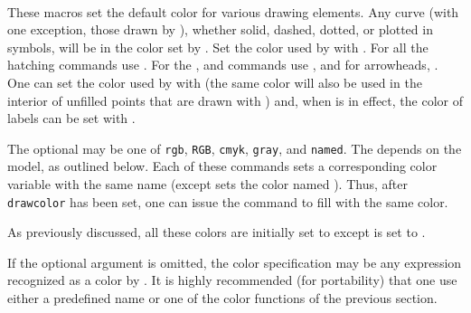 \documentclass[letterpaper]{article}
\begin{document}
\begin{cd}
\\
\\
\\
\\
\\
\\
%
%
%
%
%
%
%
%
\end{cd}

These macros set the default color for various drawing elements. Any
curve (with one exception, those drawn by ), whether solid,
dashed, dotted, or plotted in symbols, will be in the color set by
. Set the color used by  with .
For all the hatching commands use . For the ,
 and  commands use , and
for arrowheads, . One can set the color used by
 with  (the same color will also be used
in the interior of unfilled points that are drawn with ) and,
when  is in effect, the color of labels can be set with
.

The optional  may be one of \texttt{rgb}, \texttt{RGB},
\texttt{cmyk}, \texttt{gray}, and \texttt{named}. The 
depends on the model, as outlined below. Each of these commands sets a
corresponding \MP{} color variable with the same name (except
 sets the color named ). Thus, after
\texttt{drawcolor} has been set, one can issue the command
 to fill with the same color.

As previously discussed, all these colors are initially set to
 except  is set to .

If the optional  argument is omitted, the color
specification may be any expression recognized as a color by \MP{}. It
is highly recommended (for portability) that one use either a predefined
name or one of the color functions of the previous section.
\end{document}

